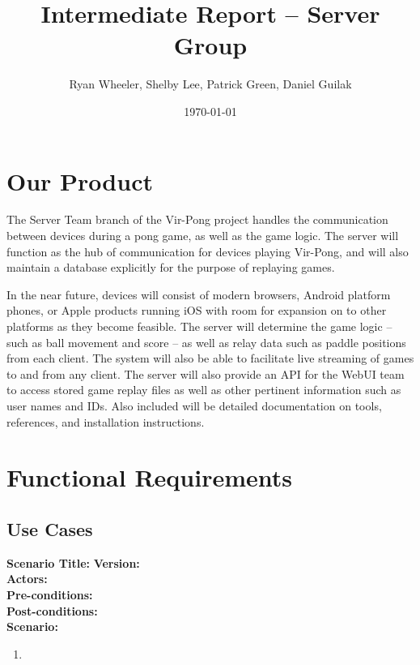 \documentclass[letterpaper,12pt]{article}
\begin{document}
\title{Intermediate Report -- Server Group}
\author{Ryan Wheeler, Shelby Lee, Patrick Green, Daniel Guilak}
\date{\today}
\maketitle
\newpage

\tableofcontents
\newpage

\section{Our Product}
The Server Team branch of the Vir-Pong project handles the communication between devices during a pong game, as well as the game logic. The server will function as the hub of communication for devices playing Vir-Pong, and will also maintain a database explicitly for the purpose of replaying games.

In the near future, devices will consist of modern browsers, Android platform phones, or Apple products running iOS with room for expansion on to other platforms as they become feasible. The server will determine the game logic -- such as ball movement and score -- as well as relay data such as paddle positions from each client. The system will also be able to facilitate live streaming of games to and from any client. The server will also provide an API for the WebUI team to access stored game replay files as well as other pertinent information such as user names and IDs. Also included will be detailed documentation on tools, references, and installation instructions.

\section{Functional Requirements}

\subsection{Use Cases}

\noindent \textbf{Scenario Title:}
\textbf{Version:} \\
\textbf{Actors:} \\
\textbf{Pre-conditions:}\\
\textbf{Post-conditions:}\\
\textbf{Scenario:}\\
\begin{enumerate}
\item
\end{enumerate}
\end{document}
